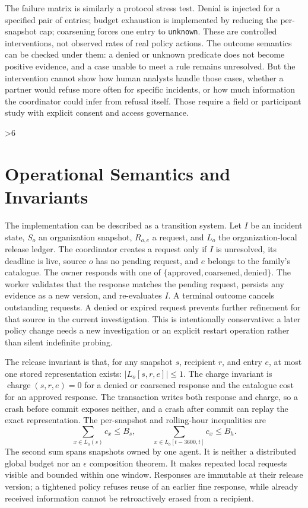 \documentclass[conference,letterpaper]{IEEEtran}
\begin{document}
The failure matrix is similarly a protocol stress test. Denial is injected for a specified pair of entries; budget exhaustion is implemented by reducing the per-snapshot cap; coarsening forces one entry to \texttt{unknown}. These are controlled interventions, not observed rates of real policy actions. The outcome semantics can be checked under them: a denied or unknown predicate does not become positive evidence, and a case unable to meet a rule remains unresolved. But the intervention cannot show how human analysts handle those cases, whether a partner would refuse more often for specific incidents, or how much information the coordinator could infer from refusal itself. Those require a field or participant study with explicit consent and access governance.

\ifnum\PaperLength>6
\section{Operational Semantics and Invariants}
The implementation can be described as a transition system. Let $I$ be an incident state, $S_o$ an organization snapshot, $R_{o,e}$ a request, and $L_o$ the organization-local release ledger. The coordinator creates a request only if $I$ is unresolved, its deadline is live, source $o$ has no pending request, and $e$ belongs to the family's catalogue. The owner responds with one of $\{\text{approved},\text{coarsened},\text{denied}\}$. The worker validates that the response matches the pending request, persists any evidence as a new version, and re-evaluates $I$. A terminal outcome cancels outstanding requests. A denied or expired request prevents further refinement for that source in the current investigation. This is intentionally conservative: a later policy change needs a new investigation or an explicit restart operation rather than silent indefinite probing.

The release invariant is that, for any snapshot $s$, recipient $r$, and entry $e$, at most one stored representation exists: $|L_o[s,r,e]|\leq1$. The charge invariant is $\operatorname{charge}(s,r,e)=0$ for a denied or coarsened response and the catalogue cost for an approved response. The transaction writes both response and charge, so a crash before commit exposes neither, and a crash after commit can replay the exact representation. The per-snapshot and rolling-hour inequalities are
\begin{equation}
\sum_{x\in L_o(s)}c_x\leq B_s,\qquad
\sum_{x\in L_o[t-3600,t]}c_x\leq B_h.
\label{eq:budgets}
\end{equation}
The second sum spans snapshots owned by one agent. It is neither a distributed global budget nor an $\epsilon$ composition theorem. It makes repeated local requests visible and bounded within one window. Responses are immutable at their release version; a tightened policy refuses reuse of an earlier fine response, while already received information cannot be retroactively erased from a recipient.
\end{document}
